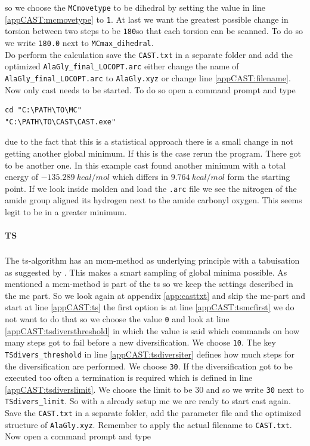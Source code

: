 \documentclass[a4paper,11pt]{scrartcl}
\newcommand{\myCite}[1]{\textsuperscript{\cite{#1}}}
\begin{document}
so we choose the \texttt{MCmovetype} to be dihedral by setting the value in line \ref{appCAST:mcmovetype} to \texttt{1}. At last we want the greatest possible change in torsion between two steps to be \texttt{180}\textdegree so that each torsion can be scanned. To do so we write \texttt{180.0} next to \texttt{MCmax\_dihedral}.\\
Do perform the calculation save the \texttt{CAST.txt} in a separate folder and add the optimized \texttt{AlaGly\_final\_LOCOPT.arc} either change the name of \texttt{AlaGly\_final\_LOCOPT.arc} to \texttt{AlaGly.xyz} or change line \ref{appCAST:filename}. Now only \ac{cast} needs to be started. To do so open a command prompt and type

\begin{lstlisting}[frame=single,]
cd "C:\PATH\TO\MC"
"C:\PATH\TO\CAST\CAST.exe"
\end{lstlisting}

due to the fact that this is a statistical approach there is a small change in not getting another global minimum. If this is the case rerun the program. There got to be another one. In this example \ac{cast} found another minimum with a total energy of $-135.289~kcal/mol$ which differs in $9.764~kcal/mol$ form the starting point. If we look inside molden and load the \texttt{.arc} file we see the nitrogen of the amide group aligned its hydrogen next to the amide carbonyl oxygen. This seems legit to be in a greater minimum. 


\paragraph{TS}The \ac{ts}-algorithm\myCite{TS:1986} has an \ac{mcm}-method as underlying principle with a tabuisation as suggested by \citeauthor{TS:1986}. This makes a smart sampling of global minima possible. As mentioned a \ac{mcm}-method is part of the \ac{ts} so we keep the settings described in the \ac{mc} part. So we look again at appendix \ref{app:casttxt} and skip the \ac{mc}-part and start at line \ref{appCAST:ts} the first option is at line \ref{appCAST:tsmcfirst} we do not want to do that so we choose the value \texttt{0} and look at line \ref{appCAST:tsdiversthreshold} in which the value is said which commands on how many steps got to fail before a new diversification. We choose \texttt{10}. The key \texttt{TSdivers\_threshold} in line \ref{appCAST:tsdiversiter} defines how much steps for the diversification are performed. We choose \texttt{30}. If the diversification got to be executed too often a termination is required which is defined in line \ref{appCAST:tsdiverslimit}. We choose the limit to be 30 and so we write \texttt{30} next to \texttt{TSdivers\_limit}. So with a already setup \ac{mc} we are ready to start \ac{cast} again. Save the \texttt{CAST.txt} in a separate folder, add the parameter file and the optimized structure of \texttt{AlaGly.xyz}. Remember to apply the actual filename to \texttt{CAST.txt}. Now open a command prompt and type
\end{document}
